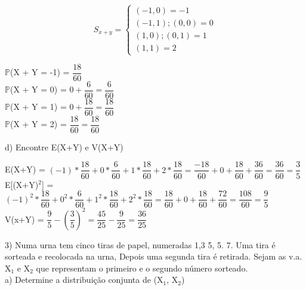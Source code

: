 \documentclass[12pt,a4paper,draft,final,oneside]{article}
\begin{document}
	\vspace{0.5cm}
	\[
	S_{x+y} =
	\begin{cases}
	(-1, 0) = -1 \\
	(-1, 1); (0, 0) = 0\\
	(1, 0); (0, 1) = 1\\
	(1, 1) =2
	\end{cases}
	\]
	\begin{center}
		\vspace{0.5cm}
		$\mathbb{P}$(X + Y = -1) = $\dfrac{18}{60}$\\
		\vspace{0.5cm}
		$\mathbb{P}$(X + Y = 0) = $0 + \dfrac{6}{60} = \dfrac{6}{60}$\\
		\vspace{0.5cm}
		$\mathbb{P}$(X + Y = 1) = $0 + \dfrac{18}{60} = \dfrac{18}{60}$\\
		\vspace{0.5cm}
		$\mathbb{P}$(X + Y = 2) = $\dfrac{18}{60} = \dfrac{18}{60}$\\
	\end{center}
	\vspace{1cm}
	d) Encontre E(X+Y) e V(X+Y)
	\begin{center}
		\vspace{0.5cm}
		E(X+Y) = $(-1)*\dfrac{18}{60} + 0*\dfrac{6}{60} + 1*\dfrac{18}{60} + 2*\dfrac{18}{60} = \dfrac{-18}{60} + 0 + \dfrac{18}{60} + \dfrac{36}{60} = \dfrac{36}{60} = \dfrac{3}{5}$
		\vspace{0.5cm}\\
		E[(X+Y)$^2$] = $(-1)^2*\dfrac{18}{60} + 0^2*\dfrac{6}{60} + 1^2*\dfrac{18}{60} + 2^2*\dfrac{18}{60} = \dfrac{18}{60} + 0 + \dfrac{18}{60} + \dfrac{72}{60} = \dfrac{108}{60} = \dfrac{9}{5}$
		\vspace{0.5cm}\\
		V(x+Y) = $\dfrac{9}{5} - (\dfrac{3}{5})^2 = \dfrac{45}{25} - \dfrac{9}{25} = \dfrac{36}{25}$
	\end{center}
	\vspace{1cm}
	3) Numa urna tem cinco tiras de papel, numeradas 1,3 5, 5. 7. Uma tira é sorteada e recolocada na urna, Depois uma segunda tira é retirada. Sejam as v.a. X$_{1}$ e X$_{2}$ que representam o primeiro e o segundo número sorteado.\\
	a) Determine a distribuição conjunta de (X$_{1}$, X$_{2}$)
\end{document}
